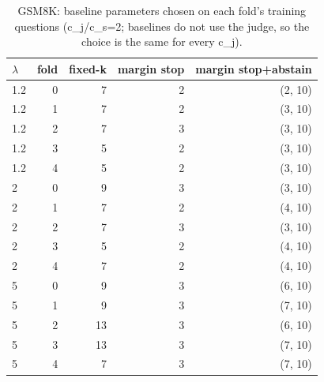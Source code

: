 \begin{table}[t]
\centering
\small
\caption{GSM8K: baseline parameters chosen on each fold's training questions (c\_j/c\_s=2; baselines do not use the judge, so the choice is the same for every c\_j).}
\label{tab:tuned_params_gsm8k}
\begin{tabular}{lrrrr}
\toprule
$\lambda$ & fold & fixed-k & margin stop & margin stop+abstain \\
\midrule
1.2 & 0 & 7 & 2 & (2, 10) \\
1.2 & 1 & 7 & 2 & (3, 10) \\
1.2 & 2 & 7 & 3 & (3, 10) \\
1.2 & 3 & 5 & 2 & (3, 10) \\
1.2 & 4 & 5 & 2 & (3, 10) \\
2 & 0 & 9 & 3 & (3, 10) \\
2 & 1 & 7 & 2 & (4, 10) \\
2 & 2 & 7 & 3 & (3, 10) \\
2 & 3 & 5 & 2 & (4, 10) \\
2 & 4 & 7 & 2 & (4, 10) \\
5 & 0 & 9 & 3 & (6, 10) \\
5 & 1 & 9 & 3 & (7, 10) \\
5 & 2 & 13 & 3 & (6, 10) \\
5 & 3 & 13 & 3 & (7, 10) \\
5 & 4 & 7 & 3 & (7, 10) \\
\bottomrule
\end{tabular}
\end{table}
